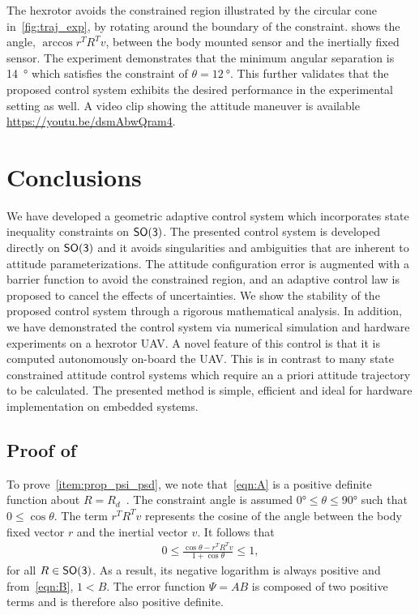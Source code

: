 \documentclass[fleqn]{IJCAS}  %
\begin{document}
\begin{multicols}{2}
The hexrotor avoids the constrained region illustrated by the circular cone in~\cref{fig:traj_exp}, by rotating around the boundary of the constraint. 
 shows the angle, \( \arccos r^T R^T v \), between the body mounted sensor and the inertially fixed sensor.
The experiment demonstrates that the minimum angular separation is \SI{14}{\degree} which satisfies the constraint of \( \theta = \SI{12}{\degree} \).
This further validates that the proposed control system exhibits the desired performance in the experimental setting as well. 
A video clip showing the attitude maneuver is available \url{https://youtu.be/dsmAbwQram4}.

\section{Conclusions}\label{sec:conclusions}
We have developed a geometric adaptive control system which incorporates state inequality constraints on \(\mathsf{SO(3)}\).
The presented control system is developed directly on \(\mathsf{SO(3)}\) and it avoids singularities and ambiguities that are inherent to attitude parameterizations.
The attitude configuration error is augmented with a barrier function to avoid the constrained region, and an adaptive control law is proposed to cancel the effects of uncertainties. 
We show the stability of the  proposed control system through a rigorous mathematical analysis.
In addition, we have demonstrated the control system via numerical simulation and hardware experiments on a hexrotor UAV.
A novel feature of this control is that it is computed autonomously on-board the UAV.
This is in contrast to many state constrained attitude control systems which require an a priori attitude trajectory to be calculated. 
The presented method is simple, efficient and ideal for hardware implementation on embedded systems.

\appendix
\subsection{Proof of~}\label{proof:config_error}
To prove~\cref{item:prop_psi_psd}, we note that~\cref{eqn:A} is a positive definite function about \( R = R_d \)~\cite{bullo2004}.
The constraint angle is assumed \( \ang{0} \leq \theta \leq \ang{90} \) such that \( 0 \leq \cos \theta \).
The term \( r^T R^T v \) represents the cosine of the angle between the body fixed vector \( r \) and the inertial vector \( v \). 
It follows that
\begin{align*}
	0 \leq  \frac{\cos \theta -  r^T R^T v}{1 + \cos \theta} \leq 1 ,
\end{align*}
for all \( R \in \mathsf{SO(3)} \). 
As a result, its negative logarithm is always positive and from~\cref{eqn:B}, \(1 < B\).
The error function \( \Psi = A B \) is composed of two positive terms and is therefore also positive definite.


\end{multicols}
\end{document}
